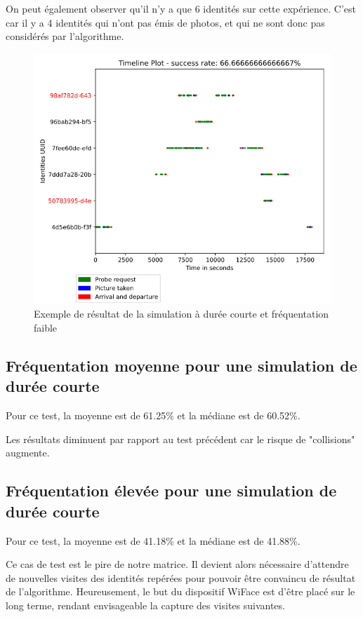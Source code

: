 On peut également observer qu'il n'y a que 6 identités sur cette expérience. C'est car il y a 4 identités
qui n'ont pas émis de photos, et qui ne sont donc pas considérés par l'algorithme.

\begin{figure}[H]
	\centering
	\includegraphics[width=12cm]{images/tests/exemple_courte_faible.png}
	\caption{Exemple de résultat de la simulation à durée courte et fréquentation faible}
	\label{fig:simulation-short-low}
\end{figure}

\subsection{Fréquentation moyenne pour une simulation de durée courte}
Pour ce test, la moyenne est de 61.25\% et la médiane est de 60.52\%.

Les résultats diminuent par rapport au test précédent car le risque de "collisions" augmente.

\subsection{Fréquentation élevée pour une simulation de durée courte}
Pour ce test, la moyenne est de 41.18\% et la médiane est de 41.88\%.

Ce cas de test est le pire de notre matrice. Il devient alors nécessaire d'attendre de nouvelles visites des identités
repérées pour pouvoir être convaincu de résultat de l'algorithme. Heureusement, le but du dispositif WiFace est d'être placé sur le long terme, rendant envisageable la capture des
visites suivantes.

